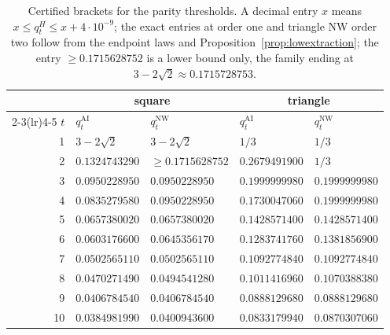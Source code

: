 \begin{table}
\centering
\small
\renewcommand{\arraystretch}{1.15}
\begin{tabular}{r@{\quad}ll@{\qquad}ll}
\toprule
& \multicolumn{2}{c}{square} & \multicolumn{2}{c}{triangle}\\
\cmidrule(lr){2-3}\cmidrule(lr){4-5}
$t$ & $q^{\mathrm{AI}}_t$ & $q^{\mathrm{NW}}_t$ & $q^{\mathrm{AI}}_t$ & $q^{\mathrm{NW}}_t$\\
\midrule
1 & $3-2\sqrt2$ & $3-2\sqrt2$ & $1/3$ & $1/3$\\
2 & $0.1324743290$ & $\ge0.1715628752$ & $0.2679491900$ & $1/3$\\
3 & $0.0950228950$ & $0.0950228950$ & $0.1999999980$ & $0.1999999980$\\
4 & $0.0835279580$ & $0.0950228950$ & $0.1730047060$ & $0.1999999980$\\
5 & $0.0657380020$ & $0.0657380020$ & $0.1428571400$ & $0.1428571400$\\
6 & $0.0603176600$ & $0.0645356170$ & $0.1283741760$ & $0.1381856900$\\
7 & $0.0502565110$ & $0.0502565110$ & $0.1092774840$ & $0.1092774840$\\
8 & $0.0470271490$ & $0.0494541280$ & $0.1011416960$ & $0.1070388380$\\
9 & $0.0406784540$ & $0.0406784540$ & $0.0888129680$ & $0.0888129680$\\
10 & $0.0384981990$ & $0.0400943600$ & $0.0833179940$ & $0.0870307060$\\
\bottomrule
\end{tabular}
\caption{Certified brackets for the parity thresholds. A decimal entry $x$ means $x\le q^H_t\le x+4\cdot10^{-9}$; the exact entries at order one and triangle NW order two follow from the endpoint laws and Proposition~\ref{prop:lowextraction}; the entry $\ge0.1715628752$ is a lower bound only, the family ending at $3-2\sqrt2\approx0.1715728753$.}\label{tab:thresholds}
\end{table}

